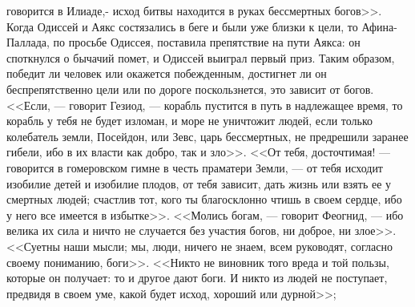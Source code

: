 \documentclass[12pt]{article}
\begin{document}
говорится в Илиаде,- исход битвы находится в руках бессмертных богов>>. Когда Одиссей и Аякс состязались в беге и были уже близки к цели, то Афина-Паллада, по просьбе Одиссея, поставила препятствие на пути Аякса: он споткнулся о бычачий помет, и Одиссей выиграл первый приз. Таким образом, победит ли человек или окажется побежденным, достигнет ли он беспрепятственно цели или по дороге поскользнется, это зависит от богов. <<Если, --- говорит Гезиод, --- корабль пустится в путь в надлежащее время, то корабль у тебя не будет изломан, и море не уничтожит людей, если только колебатель земли, Посейдон, или Зевс, царь бессмертных, не предрешили заранее гибели, ибо в их власти как добро, так и зло>>. <<От тебя, досточтимая! --- говорится в гомеровском гимне в честь праматери Земли, --- от тебя исходит изобилие детей и изобилие плодов, от тебя зависит, дать жизнь или взять ее у смертных людей; счастлив тот, кого ты благосклонно чтишь в своем сердце, ибо у него все имеется в избытке>>. <<Молись богам, --- говорит Феогнид, --- ибо велика их сила и ничто не случается без участия богов, ни доброе, ни злое>>. <<Суетны наши мысли; мы, люди, ничего не знаем, всем руководят, согласно своему пониманию, боги>>. <<Никто не виновник того вреда и той пользы, которые он получает: то и другое дают боги. И никто из людей не поступает, предвидя в своем уме, какой будет исход, хороший или дурной>>; 
\end{document}

